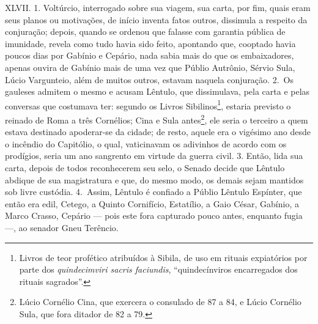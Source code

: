 XLVII. 1. Voltúrcio, interrogado sobre sua viagem, sua carta, por fim, quais
eram seus planos ou motivações, de início inventa fatos outros, dissimula a
respeito da conjuração; depois, quando se ordenou que falasse com garantia
pública de imunidade, revela como tudo havia sido feito, apontando que,
cooptado havia poucos dias por Gabínio e Cepário, nada sabia mais do que os
embaixadores, apenas ouvira de Gabínio mais de uma vez que Públio Autrônio,
Sérvio Sula, Lúcio Vargunteio, além de muitos outros, estavam naquela
conjuração. 2.~Os gauleses admitem o mesmo e acusam Lêntulo, que dissimulava,
pela carta e pelas conversas que costumava ter: segundo os Livros
Sibilinos\footnote{Livros de teor profético atribuídos à Sibila, de  uso em
rituais expiatórios por parte dos \emph{quindecimviri sacris faciundis},
``quindecínviros encarregados dos rituais sagrados''.}, estaria previsto o
reinado de Roma a três Cornélios; Cina e Sula antes\footnote{Lúcio Cornélio
Cina, que exercera o consulado de 87 a 84, e Lúcio Cornélio Sula, que fora
ditador de 82 a 79.}, ele seria o terceiro a quem estava destinado apoderar-se
da cidade; de resto, aquele era o vigésimo ano desde o incêndio do Capitólio, o
qual, vaticinavam os adivinhos de acordo com os prodígios, seria um ano
sangrento em virtude da guerra civil. 3. Então, lida sua carta, depois de todos
reconhecerem seu selo, o Senado decide que Lêntulo abdique de sua magistratura
e que, do mesmo modo, os demais sejam mantidos sob livre custódia. 4.~Assim,
Lêntulo é confiado a Públio Lêntulo Espínter, que então era edil, Cetego, a
Quinto Cornifício, Estatílio, a Gaio César, Gabínio, a Marco Crasso, Cepário
--- pois este fora capturado pouco antes, enquanto fugia ---, ao senador Gneu
Terêncio.

